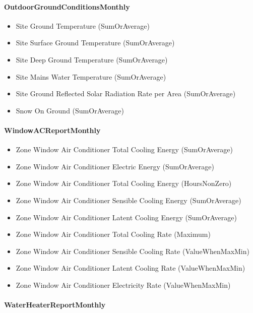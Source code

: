 \paragraph{OutdoorGroundConditionsMonthly}\label{outdoorgroundconditionsmonthly}

\begin{itemize}
\item
  Site Ground Temperature (SumOrAverage)
\item
  Site Surface Ground Temperature (SumOrAverage)
\item
  Site Deep Ground Temperature (SumOrAverage)
\item
  Site Mains Water Temperature (SumOrAverage)
\item
  Site Ground Reflected Solar Radiation Rate per Area (SumOrAverage)
\item
  Snow On Ground (SumOrAverage)
\end{itemize}

\paragraph{WindowACReportMonthly}\label{windowacreportmonthly}

\begin{itemize}
\item
  Zone Window Air Conditioner Total Cooling Energy (SumOrAverage)
\item
  Zone Window Air Conditioner Electric Energy (SumOrAverage)
\item
  Zone Window Air Conditioner Total Cooling Energy (HoursNonZero)
\item
  Zone Window Air Conditioner Sensible Cooling Energy (SumOrAverage)
\item
  Zone Window Air Conditioner Latent Cooling Energy (SumOrAverage)
\item
  Zone Window Air Conditioner Total Cooling Rate (Maximum)
\item
  Zone Window Air Conditioner Sensible Cooling Rate (ValueWhenMaxMin)
\item
  Zone Window Air Conditioner Latent Cooling Rate (ValueWhenMaxMin)
\item
  Zone Window Air Conditioner Electricity Rate (ValueWhenMaxMin)
\end{itemize}

\paragraph{WaterHeaterReportMonthly}\label{waterheaterreportmonthly}

